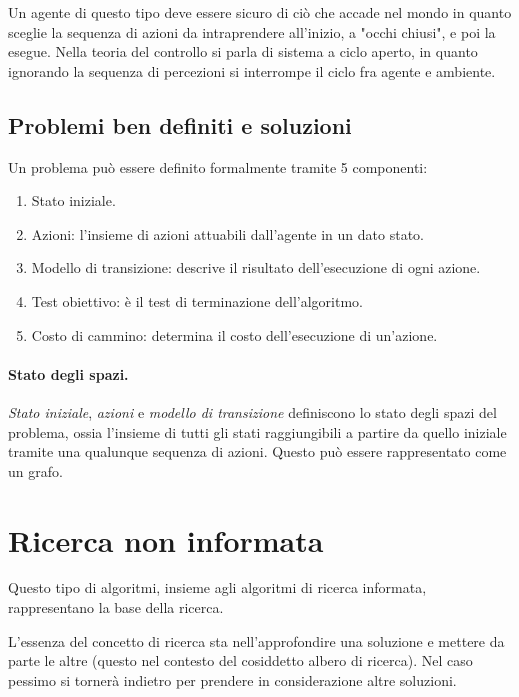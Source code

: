        Un agente di questo tipo deve essere sicuro di ciò che accade nel mondo in quanto sceglie la sequenza di azioni da intraprendere all'inizio, a "occhi chiusi", e poi la esegue. Nella teoria del controllo si parla di sistema a ciclo aperto, in quanto ignorando la sequenza di percezioni si interrompe il ciclo fra agente e ambiente.
        
    \subsection{Problemi ben definiti e soluzioni}
        Un problema può essere definito formalmente tramite 5 componenti:
        \begin{enumerate}
            \item Stato iniziale.
            \item Azioni: l'insieme di azioni attuabili dall'agente in un dato stato.
            \item Modello di transizione: descrive il risultato dell'esecuzione di ogni azione.
            \item Test obiettivo: è il test di terminazione dell'algoritmo.
            \item Costo di cammino: determina il costo dell'esecuzione di un'azione.
        \end{enumerate}
        
        \paragraph{Stato degli spazi.}
            \textit{Stato iniziale}, \textit{azioni} e \textit{modello di transizione} definiscono lo stato degli spazi del problema, ossia l'insieme di tutti gli stati raggiungibili a partire da quello iniziale tramite una qualunque sequenza di azioni. Questo può essere rappresentato come un grafo.
            
\section{Ricerca non informata}
    Questo tipo di algoritmi, insieme agli algoritmi di ricerca informata, rappresentano la base della ricerca.
    
    L'essenza del concetto di ricerca sta nell'approfondire una soluzione e mettere da parte le altre (questo nel contesto del cosiddetto albero di ricerca). Nel caso pessimo si tornerà indietro per prendere in considerazione altre soluzioni.
    
